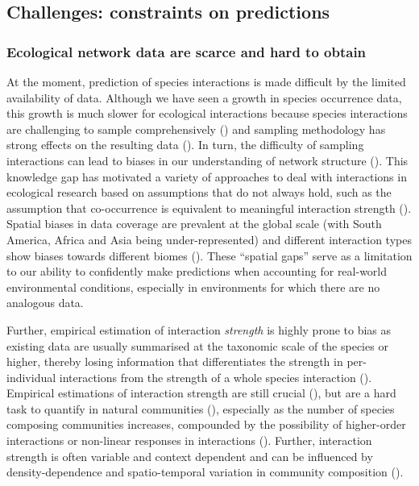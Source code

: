 \begin{refsection}
\clearpage

\subsection{Challenges: constraints on
predictions}\label{challenges-constraints-on-predictions}

\subsubsection{Ecological network data are scarce and hard to
obtain}\label{ecological-network-data-are-scarce-and-hard-to-obtain}

At the moment, prediction of species interactions is made difficult by
the limited availability of data. Although we have seen a growth in
species occurrence data, this growth is much slower for ecological
interactions because species interactions are challenging to sample
comprehensively (\cite{Bennett2019PotPit, Jordano2016SamNet}) and
sampling methodology has strong effects on the resulting data
(\cite{deAguiar2019RevBia}). In turn, the difficulty of sampling
interactions can lead to biases in our understanding of network
structure (\cite{deAguiar2019RevBia}). This knowledge gap has motivated a
variety of approaches to deal with interactions in ecological research
based on assumptions that do not always hold, such as the assumption
that co-occurrence is equivalent to meaningful interaction strength
(\cite{Blanchet2020Cooccurrence}). Spatial biases in data coverage are prevalent
at the global scale (with South America, Africa and Asia being
under-represented) and different interaction types show biases towards
different biomes (\cite{Poisot2021GloKno}). These ``spatial gaps'' serve
as a limitation to our ability to confidently make predictions when
accounting for real-world environmental conditions, especially in
environments for which there are no analogous data.

Further, empirical estimation of interaction \emph{strength} is highly
prone to bias as existing data are usually summarised at the taxonomic
scale of the species or higher, thereby losing information that
differentiates the strength in per-individual interactions from the
strength of a whole species interaction (\cite{Wells2013SpeInt}).
Empirical estimations of interaction strength are still crucial
(\cite{Novak2008EstNon}), but are a hard task to quantify in natural
communities (\cite{Wootton1997EstTes, Sala2002ComDis,
Wootton2005MeaInt}), especially as the number of species composing
communities increases, compounded by the possibility of higher-order
interactions or non-linear responses in interactions
(\cite{Wootton2005MeaInt}). Further, interaction strength is often
variable and context dependent and can be influenced by
density-dependence and spatio-temporal variation in community
composition (\cite{Wootton2005MeaInt}).


\end{refsection}
